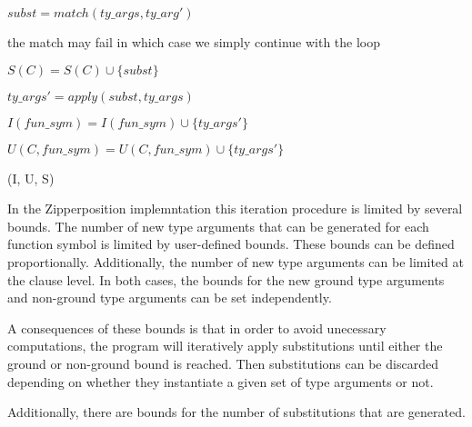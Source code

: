 \documentclass{article}
\begin{document}
\begin{algorithm}[tbh]
\begin{algorithmic}[1]
            
            \State \(subst = match(ty\_args, ty\_arg')\)

            \State \Comment the match may fail in which case we simply continue with the loop

            \State \(S(C) = S(C) \cup \{subst\}\)
         \EndFor
      \EndFor
   
   \EndFor

            \State \(ty\_args' = apply(subst, ty\_args)\)


               \State \(I(fun\_sym) = I(fun\_sym) \cup \{ty\_args'\}\)
            \Else

               \State \(U(C, fun\_sym) = U(C, fun\_sym) \cup \{ty\_args'\}\)
            \EndIf

         \EndFor
      \EndFor
   \EndFor

   \State \Return (I, U, S)

\EndFunction
\end{algorithmic}
\end{algorithm}
In the Zipperposition implemntation this iteration procedure is limited by several bounds. The number of new type arguments that can be generated for each function symbol is limited by user-defined bounds. These bounds can be defined proportionally. Additionally, the number of new type arguments can be limited at the clause level. In both cases, the bounds for the new ground type arguments and non-ground type arguments can be set independently.

A consequences of these bounds is that in order to avoid unecessary computations, the program will iteratively apply substitutions until either the ground or non-ground bound is reached. Then substitutions can be discarded depending on whether they instantiate a given set of type arguments or not.

Additionally, there are bounds for the number of substitutions that are generated.
\end{document}
